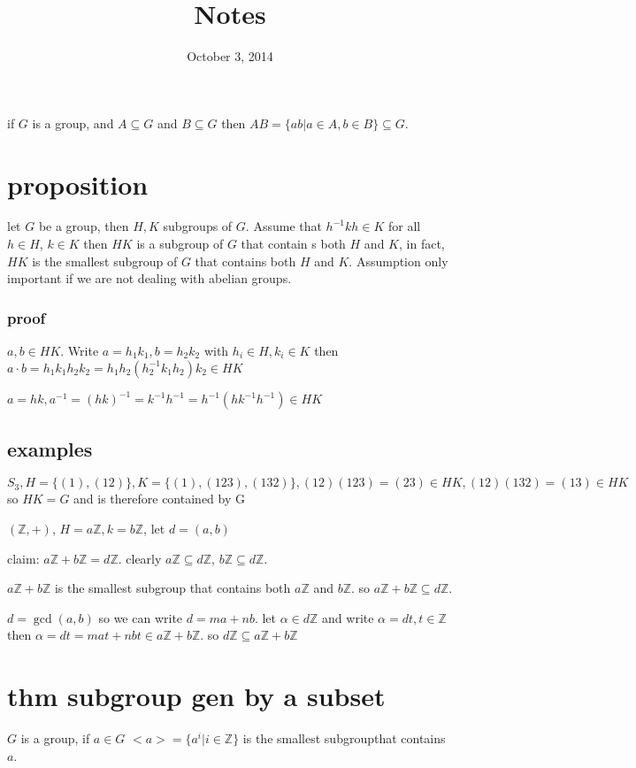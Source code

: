 \documentclass[letterpaper]{article}
\begin{document}
\title{Notes}
\date{October 3, 2014}
\maketitle
if $G$ is a group, and $A\subseteq G$ and $B\subseteq G$ then $AB=\{ab|a\in A, b\in B\}\subseteq G$.

\section*{proposition}

let $G$ be a group, then $H,K$ subgroups of $G$. Assume that $h^{-1}kh\in K$ for all $h\in H$, $k\in K$ then $HK$ is a subgroup of $G$ that contain s both $H$ and $K$, in fact, $HK$ is the smallest subgroup of $G$ that contains both $H$ and $K$. Assumption only important if we are not dealing with abelian groups.

\subsubsection*{proof}
$a,b\in HK$. Write $a=h_1k_1,b=h_2k_2$ with $h_i\in H,k_i\in K$ then $a\cdot b=h_1k_1h_2k_2=h_1h_2(h_2^{-1}k_1h_2)k_2\in HK$

$a=hk, a^{-1}=(hk)^{-1}=k^{-1}h^{-1}=h^{-1}(hk^{-1}h^{-1})\in HK$

\subsection*{examples}
$S_3, H=\{(1),(12)\}, K=\{(1),(123),(132)\}, (12)(123)=(23)\in HK, (12)(132)=(13)\in HK$ so $HK=G$ and is therefore contained by G

$(\mathbb{Z},+)$, $H=a\mathbb{Z}, k=b\mathbb{Z}$, let $d=(a,b)$

claim: $a\mathbb{Z}+b\mathbb{Z}=d\mathbb{Z}$. clearly $a\mathbb{Z}\subseteq d\mathbb{Z}$, $b\mathbb{Z}\subseteq d\mathbb{Z}$. 

$a\mathbb{Z}+b\mathbb{Z}$ is the smallest subgroup that contains both $a\mathbb{Z}$ and $b\mathbb{Z}$. so $a\mathbb{Z}+b\mathbb{Z}\subseteq d\mathbb{Z}$.

$d=\gcd(a,b)$ so we can write $d=ma+nb$. let $\alpha\in d\mathbb{Z}$ and write $\alpha=dt, t\in \mathbb{Z}$ then $\alpha=dt=mat+nbt\in a\mathbb{Z}+b\mathbb{Z}$. so $d\mathbb{Z}\subseteq a\mathbb{Z}+b\mathbb{Z}$ 
\section*{thm subgroup gen by a subset}
$G$ is a group, if $a\in G$ $<a>=\{a^i|i\in \mathbb{Z}\}$ is the smallest subgroupthat contains $a$.
\end{document}
